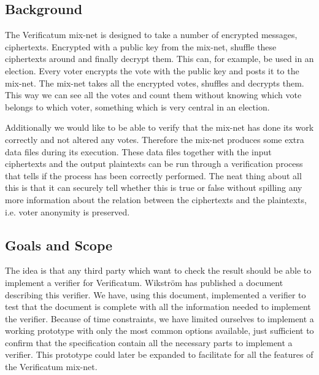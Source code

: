\subsection{Background}

The Verificatum mix-net is designed to take a number of encrypted messages, ciphertexts. Encrypted with a public key from the mix-net, shuffle these ciphertexts around and finally decrypt them. This can, for example, be used in an election. Every voter encrypts the vote with the public key and posts it to the mix-net. The mix-net takes all the encrypted votes, shuffles and decrypts them. This way we can see all the votes and count them without knowing which vote belongs to which voter, something which is very central in an election.

Additionally we would like to be able to verify that the mix-net has done its work correctly and not altered any votes. Therefore the mix-net produces some extra data files during its execution. These data files together with the input ciphertexts and the output plaintexts can be run through a verification process that tells if the process has been correctly performed. The neat thing about all this is that it can securely tell whether this is true or false without spilling any more information about the relation between the ciphertexts and the plaintexts, i.e. voter anonymity is preserved.

\subsection{Goals and Scope}

The idea is that any third party which want to check the result should be able to implement a verifier for Verificatum. Wikström has published a document describing this verifier. We have, using this document, implemented a verifier to test that the document is complete with all the information needed to implement the verifier. Because of time constraints, we have limited ourselves to implement a working prototype with only the most common options available, just sufficient to confirm that the specification contain all the necessary parts to implement a verifier. This prototype could later be expanded to facilitate for all the features of the Verificatum mix-net.
